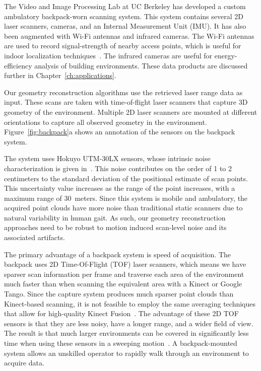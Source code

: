 \documentclass[12pt,onecolumn,oneside]{book}
\begin{document}
The Video and Image Processing Lab at UC Berkeley has developed a custom ambulatory backpack-worn scanning system.  This system contains several 2D laser scanners, cameras, and an Internal Measurement Unit (IMU).  It has also been augmented with Wi-Fi antennas and infrared cameras.  The Wi-Fi antennas are used to record signal-strength of nearby access points, which is useful for indoor localization techniques~\cite{Levchev14}.  The infrared cameras are useful for energy-efficiency analysis of building environments.  These data products are discussed further in Chapter~\ref{ch:applications}.

Our geometry reconstruction algorithms use the retrieved laser range data as input.  These scans are taken with time-of-flight laser scanners that capture 3D geometry of the environment.  Multiple 2D laser scanners are mounted at different orientations to capture all observed geometry in the environment.  Figure~\ref{fig:backpack}a shows an annotation of the sensors on the backpack system.  

The system uses Hokuyo UTM-30LX sensors, whose intrinsic noise characterization is given in~\cite{Pomerleau12,Wong11}.  This noise contributes on the order of 1 to 2 centimeters to the standard deviation of the positional estimate of scan points.  This uncertainty value increases as the range of the point increases, with a maximum range of $30$~meters.  Since this system is mobile and ambulatory, the acquired point clouds have more noise than traditional static scanners due to natural variability in human gait.  As such, our geometry reconstruction approaches need to be robust to motion induced scan-level noise and its associated artifacts.

The primary advantage of a backpack system is speed of acquisition.  The backpack uses 2D Time-Of-Flight (TOF) laser scanners, which means we have sparser scan information per frame and traverse each area of the environment much faster than when scanning the equivalent area with a Kinect or Google Tango.  Since the capture system produces much sparser point clouds than Kinect-based scanning, it is not feasible to employ the same averaging techniques that allow for high-quality Kinect Fusion~\cite{KinectFusion}.  The advantage of these 2D TOF sensors is that they are less noisy, have a longer range, and a wider field of view.  The result is that much larger environments can be covered in significantly less time when using these sensors in a sweeping motion~\cite{Sweep}.  A backpack-mounted system allows an unskilled operator to rapidly walk through an environment to acquire data.
\end{document}
